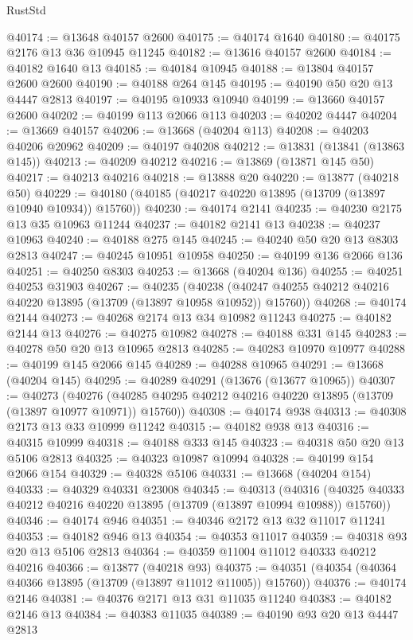 \begin{lexlean}{RustStd}
\begin{coremodule}
@40174 := @13648 @40157 @2600
@40175 := @40174 @1640
@40180 := @40175 @2176 @13 @36 @10945 @11245
@40182 := @13616 @40157 @2600
@40184 := @40182 @1640 @13
@40185 := @40184 @10945
@40188 := @13804 @40157 @2600 @2600
@40190 := @40188 @264 @145
@40195 := @40190 @50 @20 @13 @4447 @2813
@40197 := @40195 @10933 @10940
@40199 := @13660 @40157 @2600
@40202 := @40199 @113 @2066 @113
@40203 := @40202 @4447
@40204 := @13669 @40157
@40206 := @13668 (@40204 @113)
@40208 := @40203 @40206 @20962
@40209 := @40197 @40208
@40212 := @13831 (@13841 (@13863 @145))
@40213 := @40209 @40212
@40216 := @13869 (@13871 @145 @50)
@40217 := @40213 @40216
@40218 := @13888 @20
@40220 := @13877 (@40218 @50)
@40229 := @40180 (@40185 (@40217 @40220 @13895 (@13709 (@13897 @10940 @10934)) @15760))
@40230 := @40174 @2141
@40235 := @40230 @2175 @13 @35 @10963 @11244
@40237 := @40182 @2141 @13
@40238 := @40237 @10963
@40240 := @40188 @275 @145
@40245 := @40240 @50 @20 @13 @8303 @2813
@40247 := @40245 @10951 @10958
@40250 := @40199 @136 @2066 @136
@40251 := @40250 @8303
@40253 := @13668 (@40204 @136)
@40255 := @40251 @40253 @31903
@40267 := @40235
    (@40238 (@40247 @40255 @40212 @40216 @40220 @13895 (@13709 (@13897 @10958 @10952)) @15760))
@40268 := @40174 @2144
@40273 := @40268 @2174 @13 @34 @10982 @11243
@40275 := @40182 @2144 @13
@40276 := @40275 @10982
@40278 := @40188 @331 @145
@40283 := @40278 @50 @20 @13 @10965 @2813
@40285 := @40283 @10970 @10977
@40288 := @40199 @145 @2066 @145
@40289 := @40288 @10965
@40291 := @13668 (@40204 @145)
@40295 := @40289 @40291 (@13676 (@13677 @10965))
@40307 := @40273
    (@40276 (@40285 @40295 @40212 @40216 @40220 @13895 (@13709 (@13897 @10977 @10971)) @15760))
@40308 := @40174 @938
@40313 := @40308 @2173 @13 @33 @10999 @11242
@40315 := @40182 @938 @13
@40316 := @40315 @10999
@40318 := @40188 @333 @145
@40323 := @40318 @50 @20 @13 @5106 @2813
@40325 := @40323 @10987 @10994
@40328 := @40199 @154 @2066 @154
@40329 := @40328 @5106
@40331 := @13668 (@40204 @154)
@40333 := @40329 @40331 @23008
@40345 := @40313
    (@40316 (@40325 @40333 @40212 @40216 @40220 @13895 (@13709 (@13897 @10994 @10988)) @15760))
@40346 := @40174 @946
@40351 := @40346 @2172 @13 @32 @11017 @11241
@40353 := @40182 @946 @13
@40354 := @40353 @11017
@40359 := @40318 @93 @20 @13 @5106 @2813
@40364 := @40359 @11004 @11012 @40333 @40212 @40216
@40366 := @13877 (@40218 @93)
@40375 := @40351 (@40354 (@40364 @40366 @13895 (@13709 (@13897 @11012 @11005)) @15760))
@40376 := @40174 @2146
@40381 := @40376 @2171 @13 @31 @11035 @11240
@40383 := @40182 @2146 @13
@40384 := @40383 @11035
@40389 := @40190 @93 @20 @13 @4447 @2813

\end{coremodule}
\end{lexlean}

